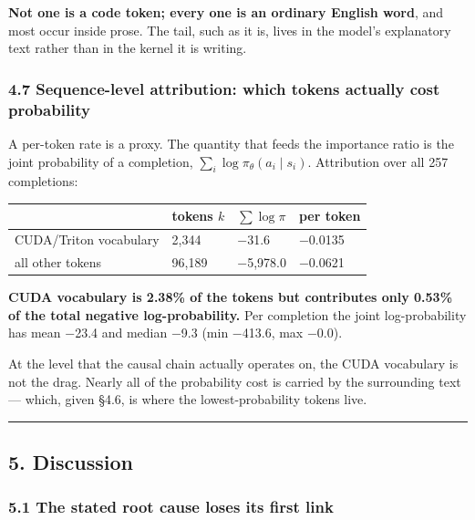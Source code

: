 \documentclass[
  11pt,
]{article}
\begin{document}
\textbf{Not one is a code token; every one is an ordinary English word},
and most occur inside prose. The tail, such as it is, lives in the
model's explanatory text rather than in the kernel it is writing.

\hypertarget{sequence-level-attribution-which-tokens-actually-cost-probability}{%
\subsubsection{4.7 Sequence-level attribution: which tokens actually
cost
probability}\label{sequence-level-attribution-which-tokens-actually-cost-probability}}

A per-token rate is a proxy. The quantity that feeds the importance
ratio is the joint probability of a completion,
\(\sum_i \log \pi_\theta(a_i \mid s_i)\). Attribution over all 257
completions:

\begin{longtable}[]{@{}llll@{}}
\toprule
& tokens \(k\) & \(\sum \log \pi\) & per token \\
\midrule
\endhead
CUDA/Triton vocabulary & 2,344 & −31.6 & −0.0135 \\
all other tokens & 96,189 & −5,978.0 & −0.0621 \\
\bottomrule
\end{longtable}

\textbf{CUDA vocabulary is 2.38\% of the tokens but contributes only
0.53\% of the total negative log-probability.} Per completion the joint
log-probability has mean −23.4 and median −9.3 (min −413.6, max −0.0).

At the level that the causal chain actually operates on, the CUDA
vocabulary is not the drag. Nearly all of the probability cost is
carried by the surrounding text --- which, given §4.6, is where the
lowest-probability tokens live.

\begin{center}\rule{0.5\linewidth}{0.5pt}\end{center}

\hypertarget{discussion}{%
\subsection{5. Discussion}\label{discussion}}

\hypertarget{the-stated-root-cause-loses-its-first-link}{%
\subsubsection{5.1 The stated root cause loses its first
link}\label{the-stated-root-cause-loses-its-first-link}}
\end{document}
